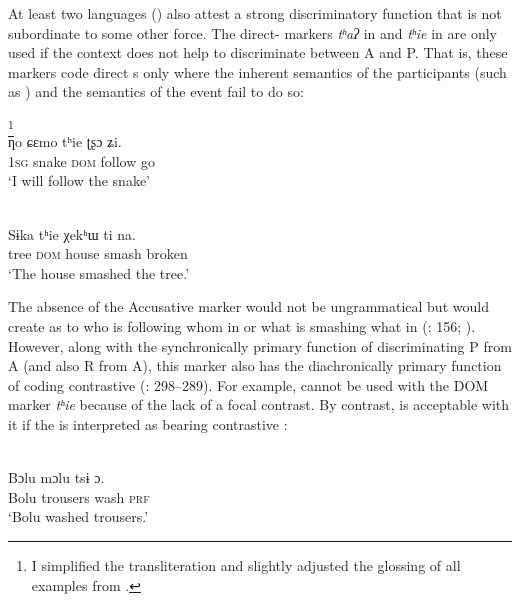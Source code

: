 \documentclass[output=paper]{langsci/langscibook}
\begin{document}
At least two  languages () also attest a strong discriminatory function that is not subordinate to some other force. The direct- markers \textit{tʰ}\textit{aʔ} in  and \textit{tʰ}\textit{ie} in  are only used if the context does not help to discriminate between A and P. That is, these markers code direct s only where the inherent semantics of the participants (such as ) and the semantics of the event fail to do so:

\ea\label{ex:serzant:25}
\footnote{I simplified the transliteration and slightly adjusted the glossing of all examples from \citet{Gerner2008}.}\\
\gll ƞo   ɕεmo   tʰie   ʈʂɔ   ʑi.\\
     1\textsc{sg}  snake  \textsc{dom}  follow  go\\
\glt ‘I will follow the snake’
\z

\ea\label{ex:serzant:26}
\\
\gll Sɨka   tʰie   χekʰɯ   ti   na.\\
     tree  \textsc{dom}  house  smash  broken\\
\glt ‘The house smashed the tree.’
\z

\noindent The absence of the Accusative marker would not be ungrammatical but would create  as to who is following whom in  or what is smashing what in  (\citealt{Matisoff1973}: 156; \citealt{Gerner2008}). However, along with the synchronically primary function of discriminating P from A (and also R from A), this marker also has the diachronically primary function of coding contrastive  (\citealt{Gerner2008}: 298–289). For example,  cannot be used with the DOM marker \textit{tʰ}\textit{ie} because of the lack of a focal contrast. By contrast,  is acceptable with it if the  is interpreted as bearing contrastive  \citep[299]{Gerner2008}:

\ea\label{ex:serzant:27}
\\
\ea\label{ex:serzant:27a}
\gll Bɔlu   mɔlu     tsɨ   ɔ.\\
     Bolu  trousers  wash  \textsc{prf}\\
\glt ‘Bolu washed trousers.’
\end{document}
